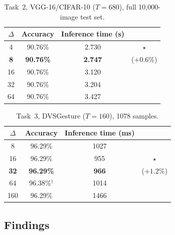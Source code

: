 \documentclass[runningheads]{llncs}
\begin{document}
\begin{table}[t]
\centering
\caption{Task~2, VGG-16/CIFAR-10 ($T=680$), full 10{,}000-image test set.}
\label{tab:chunk-t2}
\begin{tabular}{cccc}
\toprule
$\Delta$ & Accuracy & Inference time (s) & \\
\midrule
4  & 90.76\% & 2.730 & $\star$ \\
\textbf{8}  & \textbf{90.76\%} & \textbf{2.747} & ($+0.6\%$) \\
16 & 90.76\% & 3.120 & \\
32 & 90.76\% & 3.204 & \\
64 & 90.76\% & 3.427 & \\
\bottomrule
\end{tabular}
\end{table}

\begin{table}[t]
\centering
\caption{Task~3, DVSGesture ($T=160$), 1078 samples.}
\label{tab:chunk-t3}
\begin{tabular}{cccc}
\toprule
$\Delta$ & Accuracy & Inference time (ms) & \\
\midrule
8   & 96.29\% & 1027 & \\
16  & 96.29\% & 955  & $\star$ \\
\textbf{32}  & \textbf{96.29\%} & \textbf{966}  & ($+1.2\%$) \\
64  & 96.38\%$^{\dagger}$ & 1014 & \\
160 & 96.29\% & 1466 & \\
\bottomrule
\end{tabular}
\end{table}

\subsection{Findings}\label{app:chunk-find}
\end{document}
